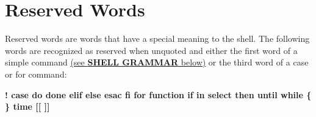 \section{Reserved Words}
\label{sec:reservedwords}
Reserved words are words that have a special meaning to the shell. The following words are recognized as reserved when unquoted and either the first word of a simple command \hyperref[sec:shellgrammar]{(see \textbf{SHELL GRAMMAR} below)} or the third word of a case or for command:

\begin{center}
    
\textbf{! case do done elif else esac fi for function if in select then until while \{ \} time [[ ]]}
\end{center}
